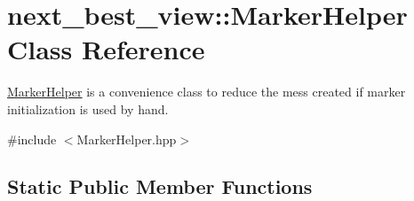 \hypertarget{classnext__best__view_1_1MarkerHelper}{\section{next\-\_\-best\-\_\-view\-:\-:\-Marker\-Helper \-Class \-Reference}
\label{classnext__best__view_1_1MarkerHelper}
}


\hyperlink{classnext__best__view_1_1MarkerHelper}{\-Marker\-Helper} is a convenience class to reduce the mess created if marker initialization is used by hand.  




{\ttfamily \#include $<$\-Marker\-Helper.\-hpp$>$}

\subsection*{\-Static \-Public \-Member \-Functions}
